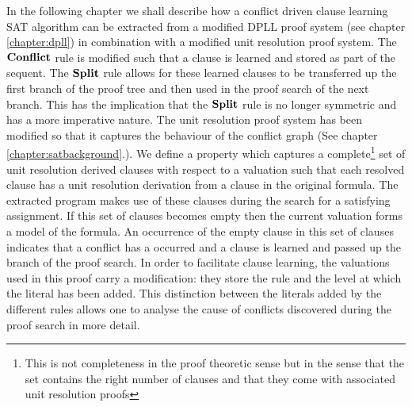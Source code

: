 \newcommand{\lit}[1]{\mathrm{Lit}(#1)}
\newcommand{\first}[1]{\mathrm{First}(#1)}
\newcommand{\second}[1]{\mathrm{Second}(#1)}
\newcommand{\extends}[2]{\mathrm{extends(#1,#2)}}
\newcommand{\UnitSub}{\dpllrule{UnitSub}}
\newcommand{\SplitSub}{\dpllrule{SplitSub}}
\newcommand{\complete}[3]{\mathrm{complete}(#1;#2; #3)}
\newcommand{\DeltaVec}{\overrightarrow{\Delta}}
\newcommand{\unitdec}[2]{(U \, #1 \, #2)}
\newcommand{\unitdecg}[1]{\unitdec{#1}{\delta(\Gamma)}}
\newcommand{\unitdecgone}[1]{\unitdec{#1}{\delta(\Gamma) + 1}}
\newcommand{\splitdec}[2]{(S \, #1 \, #2)}
\newcommand{\splitdecg}[1]{\splitdec{#1}{\delta(\Gamma)}}
\newcommand{\splitdecgone}[1]{\splitdec{#1}{\delta(\Gamma) + 1}}
\newcommand{\clmodres}[2]{\overset{#1;#2}{\underset{URes}{\vdash}}}


 \label{chapter:cdclproof}
In the following chapter we shall describe how a conflict driven clause learning SAT algorithm can be extracted from a modified DPLL proof system (see chapter \ref{chapter:dpll}) in combination with a modified unit resolution proof system. The $\mathbf{Conflict}$ rule is modified such that a clause is learned and stored as part of the sequent. The $\mathbf{Split}$ rule allows for these learned clauses to be transferred up the first branch of the proof tree and then used in the proof search of the next branch. This has the implication that the $\mathbf{Split}$ rule is no longer symmetric and has a more imperative nature. The unit resolution proof system has been modified so that it captures the behaviour  of the conflict graph (See chapter \ref{chapter:satbackground}.). We define a property which captures a complete\footnote{This is not completeness in the proof theoretic sense but in the sense that the set contains the right number of clauses  and that they come with associated unit resolution proofs} set of unit resolution derived clauses with respect to a valuation such that each resolved clause has a unit resolution derivation from a clause in the original formula. The extracted program makes use of these clauses during the search for a satisfying assignment. If this set of clauses becomes empty then the current valuation forms a model of the formula. An occurrence of the empty clause in this set of clauses indicates that a conflict has a occurred and a clause is learned and passed up the branch of the proof search. In order to facilitate clause learning, the valuations used in this proof carry a modification: they store the rule and the level at which the literal has been added. This distinction between the literals added by the different rules allows one to analyse the cause of conflicts discovered during the proof search in more detail.


